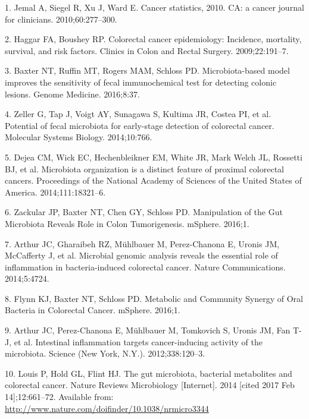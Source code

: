 \documentclass[12pt,]{article}
\begin{document}
\hypertarget{refs}{}
\hypertarget{ref-jemal_cancer_2010}{}
1. Jemal A, Siegel R, Xu J, Ward E. Cancer statistics, 2010. CA: a
cancer journal for clinicians. 2010;60:277--300.

\hypertarget{ref-haggar_colorectal_2009}{}
2. Haggar FA, Boushey RP. Colorectal cancer epidemiology: Incidence,
mortality, survival, and risk factors. Clinics in Colon and Rectal
Surgery. 2009;22:191--7.

\hypertarget{ref-baxter_microbiota-based_2016}{}
3. Baxter NT, Ruffin MT, Rogers MAM, Schloss PD. Microbiota-based model
improves the sensitivity of fecal immunochemical test for detecting
colonic lesions. Genome Medicine. 2016;8:37.

\hypertarget{ref-zeller_potential_2014}{}
4. Zeller G, Tap J, Voigt AY, Sunagawa S, Kultima JR, Costea PI, et al.
Potential of fecal microbiota for early-stage detection of colorectal
cancer. Molecular Systems Biology. 2014;10:766.

\hypertarget{ref-dejea_microbiota_2014}{}
5. Dejea CM, Wick EC, Hechenbleikner EM, White JR, Mark Welch JL,
Rossetti BJ, et al. Microbiota organization is a distinct feature of
proximal colorectal cancers. Proceedings of the National Academy of
Sciences of the United States of America. 2014;111:18321--6.

\hypertarget{ref-zackular_manipulation_2016}{}
6. Zackular JP, Baxter NT, Chen GY, Schloss PD. Manipulation of the Gut
Microbiota Reveals Role in Colon Tumorigenesis. mSphere. 2016;1.

\hypertarget{ref-arthur_microbial_2014}{}
7. Arthur JC, Gharaibeh RZ, Mühlbauer M, Perez-Chanona E, Uronis JM,
McCafferty J, et al. Microbial genomic analysis reveals the essential
role of inflammation in bacteria-induced colorectal cancer. Nature
Communications. 2014;5:4724.

\hypertarget{ref-flynn_metabolic_2016}{}
8. Flynn KJ, Baxter NT, Schloss PD. Metabolic and Community Synergy of
Oral Bacteria in Colorectal Cancer. mSphere. 2016;1.

\hypertarget{ref-arthur_intestinal_2012}{}
9. Arthur JC, Perez-Chanona E, Mühlbauer M, Tomkovich S, Uronis JM, Fan
T-J, et al. Intestinal inflammation targets cancer-inducing activity of
the microbiota. Science (New York, N.Y.). 2012;338:120--3.

\hypertarget{ref-louis_gut_2014}{}
10. Louis P, Hold GL, Flint HJ. The gut microbiota, bacterial
metabolites and colorectal cancer. Nature Reviews Microbiology
{[}Internet{]}. 2014 {[}cited 2017 Feb 14{]};12:661--72. Available from:
\url{http://www.nature.com/doifinder/10.1038/nrmicro3344}
\end{document}
